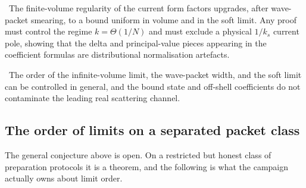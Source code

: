 \begin{conjecture}
\label{conj:ml3}
\statusConjecture\ The finite-volume regularity of the current form factors
upgrades, after wave-packet smearing, to a bound uniform in volume and in the
soft limit. Any proof must control the regime $k=\Theta(1/N)$ and must exclude
a physical $1/k_s$ current pole, showing that the delta and principal-value
pieces appearing in the coefficient formulas are distributional normalisation
artefacts.
\end{conjecture}

\begin{conjecture}
\label{conj:ml6}
\statusConjecture\ The order of the infinite-volume limit, the wave-packet
width, and the soft limit can be controlled in general, and the bound state
and off-shell coefficients do not contaminate the leading real scattering
channel.
\end{conjecture}

\subsection{The order of limits on a separated packet class}

The general conjecture above is open. On a restricted but honest class of
preparation protocols it is a theorem, and the following is what the campaign
actually owns about limit order.

